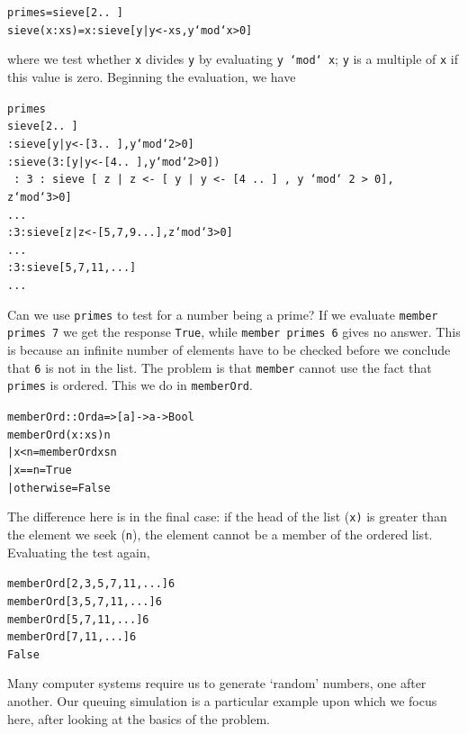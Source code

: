 \begin{example}
\begin{alltt}
primes       = sieve [2 ..\ ]
sieve (x:xs) = x : sieve [ y | y <- xs , y `mod` x > 0]
\end{alltt}
where we test whether \texttt{x} divides 
\texttt{y} by evaluating \texttt{y `mod` x}; \texttt{y} is a multiple of \texttt{x} if this
value is zero. Beginning the evaluation, we have
\begin{alltt}
primes 
\step sieve [2 ..\ ]
 : sieve [ y | y <- [3 ..\ ] , y `mod` 2 > 0]
 : sieve (3 : [ y | y <- [4 ..\ ] , y `mod` 2 > 0])
\mbox{\texttt{ : 3 : sieve [ z | z <- [ y | y <- [4 ..\ ] , y `mod` 2 > 0],}}
                      z `mod` 3 > 0]  
\step ...
 : 3 : sieve [ z | z <- [5,7,9...] , z `mod` 3 > 0]  
\step ...
 : 3 : sieve [5,7,11,...]  
\step ...
\end{alltt}
Can we use \texttt{primes} to test for a number being a prime? If we evaluate 
\texttt{member primes 7} we get the response \texttt{True},
while \texttt{member primes 6} gives no answer. This is because an 
infinite number of elements have to be checked before we conclude that
\texttt{6} is not in the list. The problem is that \texttt{member} cannot use the
fact that \texttt{primes} is ordered. This we do in \texttt{memberOrd}.
\begin{alltt}
memberOrd :: Ord a => [a] -> a -> Bool
memberOrd (x:xs) n
  | x<n         = memberOrd xs n
  | x==n        = True
  | otherwise   = False
\end{alltt}
The difference here is in the final case: if the head of the list (\texttt{x)}
is greater
than the element we seek (\texttt{n}),
the element cannot be a member of the ordered list.
Evaluating the test again,
\begin{alltt}
memberOrd [2,3,5,7,11,...] 6
\step memberOrd [3,5,7,11,...] 6  
\step memberOrd [5,7,11,...] 6  
\step memberOrd [7,11,...] 6 
\step False
\end{alltt}
\vspace{5pt}



Many computer systems require us to generate `random' numbers, one after
another. Our queuing simulation is a particular example upon which we focus
here, after looking at the basics of the problem.


\end{example}
